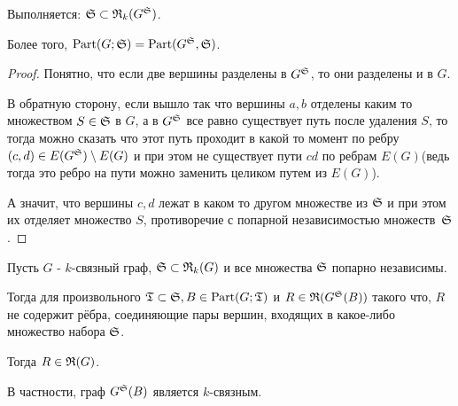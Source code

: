 \documentclass[../main.tex]{subfiles}
\begin{document}
\begin{customlm}{1.1} \label{lemma:1_1}
	Выполняется: $\S \subset \R_k(G^\S)$.

	Более того, $\Part(G; \S) = \Part(G^\S, \S)$.
\end{customlm}

\begin{proof}
	Понятно, что если две вершины разделены в $G^\S$, то они разделены и в $G$.

	В обратную сторону, если вышло так что вершины $a, b$ отделены каким то множеством $S \in \S$ в  $G$, а в  $G^\S$ все равно существует путь после удаления $S$, то тогда можно сказать что этот путь проходит в какой то момент по ребру  $(c,d) \in E(G^\S) \setminus E(G)$ и при этом не существует пути $cd$ по ребрам $E(G)$(ведь тогда это ребро на пути можно заменить целиком путем из $E(G)$).

	А значит, что вершины $c, d$ лежат в каком то другом множестве из  $\S$ и при этом их отделяет множество  $S$, противоречие с попарной независимостью множеств~$\S$.
\end{proof}

\begin{customlm}{1.2} \label{lemma:1_2}
	Пусть $G$ - $k$-связный граф, $\S \subset \R_k(G)$ и все множества $\S$ попарно независимы.

	Тогда для произвольного $\T \subset \S, B \in \Part(G; \T)$ и $R \in \R(G^\S(B))$ такого что, $R$ не содержит рёбра, соединяющие пары вершин, входящих в какое-либо множество набора $\S$.
	
	Тогда $R \in \R(G)$.

	В частности, граф  $G^\S(B)$ является $k$-связным.
\end{customlm}
\end{document}
